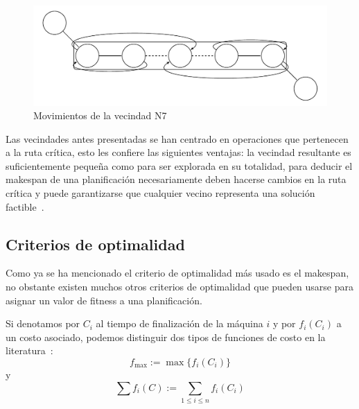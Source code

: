 \begin{itemize}
\begin{figure}[H]
\centering
\includegraphics[scale=.7]{Imagenes/N7.pdf}
\caption{Movimientos de la vecindad N7}
\end{figure}
\end{itemize}

Las vecindades antes presentadas se han centrado en operaciones que pertenecen a la ruta crítica, esto les confiere las siguientes ventajas: la vecindad resultante es 
suficientemente pequeña como para ser explorada en su totalidad, para deducir el makespan de una planificación necesariamente deben hacerse cambios en la ruta crítica 
y puede garantizarse que cualquier vecino representa una solución factible~\cite{balas1969machine}.

%

\subsection*{Criterios de optimalidad}
Como ya se ha mencionado el criterio de optimalidad más usado es el makespan, no obstante existen muchos otros criterios de optimalidad que pueden usarse para 
asignar un valor de fitness a una planificación. 

Si denotamos por $C_i$ al tiempo de finalización de la máquina $i$ y por $f_i(C_i)$ a un costo asociado, podemos distinguir dos tipos de funciones de 
costo en la literatura~\cite{Brucker2001}:
\[f_{\max}:=\max\{f_i(C_i)\}\]
y 
\[\sum f_i(C):=\sum_{1\leq i\leq n}f_i(C_i)\]

